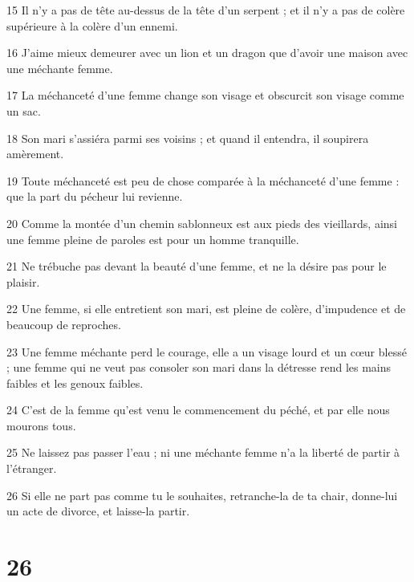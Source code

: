 \par 15 Il n'y a pas de tête au-dessus de la tête d'un serpent ; et il n’y a pas de colère supérieure à la colère d’un ennemi.
\par 16 J'aime mieux demeurer avec un lion et un dragon que d'avoir une maison avec une méchante femme.
\par 17 La méchanceté d'une femme change son visage et obscurcit son visage comme un sac.
\par 18 Son mari s'assiéra parmi ses voisins ; et quand il entendra, il soupirera amèrement.
\par 19 Toute méchanceté est peu de chose comparée à la méchanceté d'une femme : que la part du pécheur lui revienne.
\par 20 Comme la montée d'un chemin sablonneux est aux pieds des vieillards, ainsi une femme pleine de paroles est pour un homme tranquille.
\par 21 Ne trébuche pas devant la beauté d'une femme, et ne la désire pas pour le plaisir.
\par 22 Une femme, si elle entretient son mari, est pleine de colère, d'impudence et de beaucoup de reproches.
\par 23 Une femme méchante perd le courage, elle a un visage lourd et un cœur blessé ; une femme qui ne veut pas consoler son mari dans la détresse rend les mains faibles et les genoux faibles.
\par 24 C'est de la femme qu'est venu le commencement du péché, et par elle nous mourons tous.
\par 25 Ne laissez pas passer l'eau ; ni une méchante femme n'a la liberté de partir à l'étranger.
\par 26 Si elle ne part pas comme tu le souhaites, retranche-la de ta chair, donne-lui un acte de divorce, et laisse-la partir.

\chapter{26}

